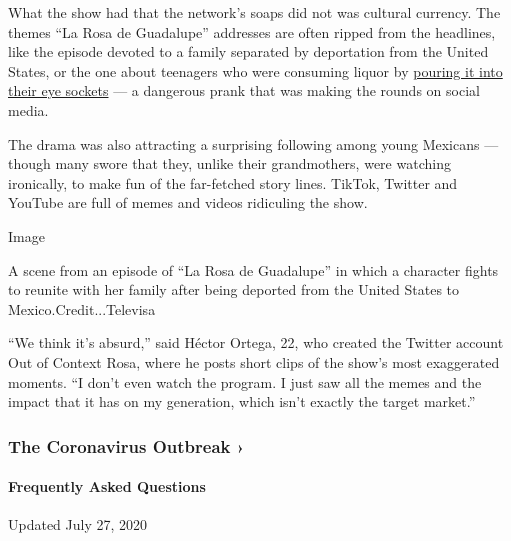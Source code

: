 What the show had that the network's soaps did not was cultural
currency. The themes ``La Rosa de Guadalupe'' addresses are often ripped
from the headlines, like the episode devoted to a family separated by
deportation from the United States, or the one about teenagers who were
consuming liquor by
\href{https://www.ncbi.nlm.nih.gov/pmc/articles/PMC4009175/}{pouring it
into their eye sockets} --- a dangerous prank that was making the rounds
on social media.

The drama was also attracting a surprising following among young
Mexicans --- though many swore that they, unlike their grandmothers,
were watching ironically, to make fun of the far-fetched story lines.
TikTok, Twitter and YouTube are full of memes and videos ridiculing the
show.

Image

A scene from an episode of ``La Rosa de Guadalupe'' in which a character
fights to reunite with her family after being deported from the United
States to Mexico.Credit...Televisa

``We think it's absurd,'' said Héctor Ortega, 22, who created the
Twitter account Out of Context Rosa, where he posts short clips of the
show's most exaggerated moments. ``I don't even watch the program. I
just saw all the memes and the impact that it has on my generation,
which isn't exactly the target market.''

\href{https://www.nytimes.com/news-event/coronavirus?action=click\&pgtype=Article\&state=default\&region=MAIN_CONTENT_3\&context=storylines_faq}{}

\hypertarget{the-coronavirus-outbreak-}{%
\subsubsection{The Coronavirus Outbreak
›}\label{the-coronavirus-outbreak-}}

\hypertarget{frequently-asked-questions}{%
\paragraph{Frequently Asked
Questions}\label{frequently-asked-questions}}

Updated July 27, 2020

